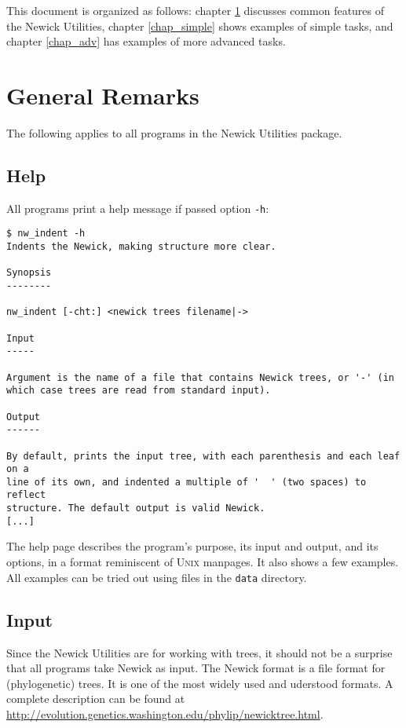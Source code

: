\documentclass[a4paper,10pt]{report}
\newcommand{\nutils}{Newick Utilities}
\newcommand{\unix}{\textsc{Unix}}
\theoremstyle{definition}
\theoremstyle{definition}
\begin{document}
This document is organized as follows: chapter \ref{chap_general} discusses common features of the \nutils, chapter \ref{chap_simple} shows examples of simple tasks, and chapter \ref{chap_adv} has examples of more advanced tasks. 

\chapter{General Remarks}
\label{chap_general}

The following applies to all programs in the \nutils{} package.

\section{Help}
\label{sect_help}

All programs print a help message if passed option \texttt{-h}:

\begin{samepage}
\begin{verbatim}
$ nw_indent -h
Indents the Newick, making structure more clear.

Synopsis
--------

nw_indent [-cht:] <newick trees filename|->

Input
-----

Argument is the name of a file that contains Newick trees, or '-' (in
which case trees are read from standard input).

Output
------

By default, prints the input tree, with each parenthesis and each leaf on a
line of its own, and indented a multiple of '  ' (two spaces) to reflect
structure. The default output is valid Newick.
[...]
\end{verbatim}
\end{samepage}
The help page describes the program's purpose, its input and output, and its options, in a format reminiscent of \unix{} manpages. It also shows a few examples. All examples can be tried out using files in the \texttt{data} directory.

\section{Input}
\label{sect_input}

Since the \nutils{} are for working with trees, it should not be a surprise that all programs take Newick as input. The Newick format is a file format for (phylogenetic) trees. It is one of the most widely used and uderstood formats.
A complete description can be found at \url{http://evolution.genetics.washington.edu/phylip/newicktree.html}.
\end{document}
